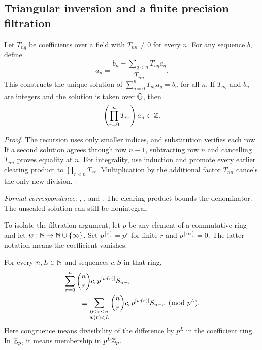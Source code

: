 \subsection{Triangular inversion and a finite precision filtration}

\begin{theorem}
\label{thm:triangular-foundation}
Let $T_{nq}$ be coefficients over a field with $T_{nn}\ne0$ for every $n$.
For any sequence $b$, define
\[
a_n=\frac{b_n-\sum_{q<n}T_{nq}a_q}{T_{nn}}.
\]
This constructs the unique solution of
$\sum_{q=0}^{n}T_{nq}a_q=b_n$ for all $n$. If $T_{nq}$ and $b_n$ are integers
and the solution is taken over $\mathbb Q$, then
\[
\left(\prod_{r=0}^{n}T_{rr}\right)a_n\in\mathbb Z.
\]
\end{theorem}

\begin{proof}
The recursion uses only smaller indices, and substitution verifies each row.
If a second solution agrees through row $n-1$, subtracting row $n$ and
cancelling $T_{nn}$ proves equality at $n$. For integrality, use induction and
promote every earlier clearing product to $\prod_{r<n}T_{rr}$. Multiplication
by the additional factor $T_{nn}$ cancels the only new division.
\end{proof}

\begingroup\small\raggedright
\noindent\emph{Formal correspondence.}
, , and
. The clearing product bounds the
denominator. The unscaled solution can still be nonintegral.
\par\endgroup

To isolate the filtration argument, let $p$ be any element of a commutative
ring and let $w:\mathbb N\to\mathbb N\cup\{\infty\}$. Set $p^{[r]}=p^r$ for finite $r$
and $p^{[\infty]}=0$. The latter notation means the coefficient vanishes.

\begin{theorem}
\label{thm:filtered-foundation}
For every $n,L\in\mathbb N$ and sequences $c,S$ in that ring,
\[
\begin{split}
&\sum_{r=0}^{n}\binom nr c_rp^{[w(r)]}S_{n-r}\\
&\hspace{8mm}\equiv
\sum_{\substack{0\leq r\leq n\\w(r)<L}}
\binom nr c_rp^{[w(r)]}S_{n-r}\pmod{p^L}.
\end{split}
\]
Here congruence means divisibility of the difference by $p^L$ in the
coefficient ring. In $\mathbb Z_p$, it means membership in $p^L\mathbb Z_p$.
\end{theorem}


